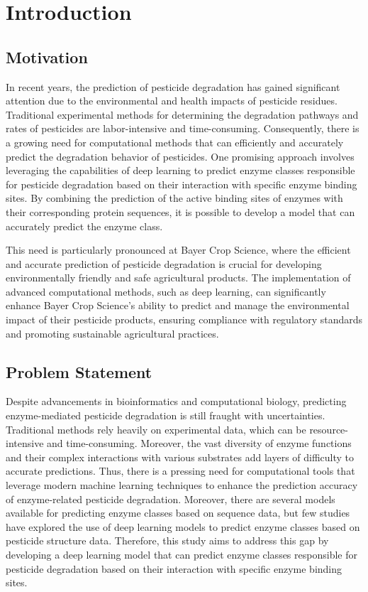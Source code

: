 \section{Introduction}

\subsection{Motivation}
\label{sec:Motivation}

In recent years, the prediction of pesticide degradation has gained significant attention due to the environmental and health impacts of pesticide residues. Traditional experimental methods for determining the degradation pathways and rates of pesticides are labor-intensive and time-consuming. Consequently, there is a growing need for computational methods that can efficiently and accurately predict the degradation behavior of pesticides. One promising approach involves leveraging the capabilities of deep learning to predict enzyme classes responsible for pesticide degradation based on their interaction with specific enzyme binding sites. By combining the prediction of the active binding sites of enzymes with their corresponding protein sequences, it is possible to develop a model that can accurately predict the enzyme class.

This need is particularly pronounced at Bayer Crop Science, where the efficient and accurate prediction of pesticide degradation is crucial for developing environmentally friendly and safe agricultural products. The implementation of advanced computational methods, such as deep learning, can significantly enhance Bayer Crop Science's ability to predict and manage the environmental impact of their pesticide products, ensuring compliance with regulatory standards and promoting sustainable agricultural practices.


\subsection{Problem Statement}
\label{sec:Problem Statement}

Despite advancements in bioinformatics and computational biology, predicting enzyme-mediated pesticide degradation is still fraught with uncertainties. Traditional methods rely heavily on experimental data, which can be resource-intensive and time-consuming. Moreover, the vast diversity of enzyme functions and their complex interactions with various substrates add layers of difficulty to accurate predictions. Thus, there is a pressing need for computational tools that leverage modern machine learning techniques to enhance the prediction accuracy of enzyme-related pesticide degradation. Moreover, there are several models available for predicting enzyme classes based on sequence data, but few studies have explored the use of deep learning models to predict enzyme classes based on pesticide structure data. Therefore, this study aims to address this gap by developing a deep learning model that can predict enzyme classes responsible for pesticide degradation based on their interaction with specific enzyme binding sites.

